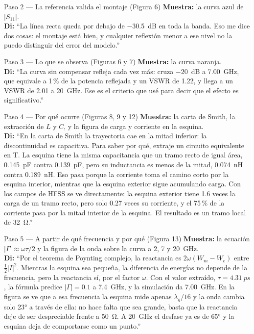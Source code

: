 \documentclass[11pt,letterpaper]{article}
\begin{document}
\begin{paso}{Paso 2 --- La referencia valida el montaje (Figura 6)}
\textbf{Muestra:} la curva azul de $|S_{11}|$.\\
\textbf{Di:} ``La línea recta queda por debajo de \SI{-30.5}{dB} en toda la banda. Eso me dice dos cosas: el montaje está bien, y cualquier reflexión menor a ese nivel no la puedo distinguir del error del modelo.''
\end{paso}

\begin{paso}{Paso 3 --- Lo que se observa (Figuras 6 y 7)}
\textbf{Muestra:} la curva naranja.\\
\textbf{Di:} ``La curva sin compensar refleja cada vez más: cruza $-20$~dB a \SI{7.00}{GHz}, que equivale a 1\,\% de la potencia reflejada y un VSWR de 1.22, y llega a un VSWR de 2.01 a \SI{20}{GHz}. Ese es el criterio que usé para decir que el efecto es significativo.''
\end{paso}

\begin{paso}{Paso 4 --- Por qué ocurre (Figuras 8, 9 y 12)}
\textbf{Muestra:} la carta de Smith, la extracción de $L$ y $C$, y la figura de carga y corriente en la esquina.\\
\textbf{Di:} ``En la carta de Smith la trayectoria cae en la mitad inferior: la discontinuidad es capacitiva. Para saber por qué, extraje un circuito equivalente en T. La esquina tiene la misma capacitancia que un tramo recto de igual área, \SI{0.145}{pF} contra \SI{0.139}{pF}, pero su inductancia es menos de la mitad, \SI{0.074}{nH} contra \SI{0.189}{nH}. Eso pasa porque la corriente toma el camino corto por la esquina interior, mientras que la esquina exterior sigue acumulando carga. Con los campos de HFSS se ve directamente: la esquina exterior tiene 1.6 veces la carga de un tramo recto, pero solo 0.27 veces su corriente, y el 75\,\% de la corriente pasa por la mitad interior de la esquina. El resultado es un tramo local de \SI{32}{\ohm}.''
\end{paso}

\begin{paso}{Paso 5 --- A partir de qué frecuencia y por qué (Figura 13)}
\textbf{Muestra:} la ecuación $|\Gamma|\approx\omega\tau/2$ y la figura de la onda sobre la curva a 2, 7 y \SI{20}{GHz}.\\
\textbf{Di:} ``Por el teorema de Poynting complejo, la reactancia es $2\omega(W_m-W_e)$ entre $\tfrac12|I|^2$. Mientras la esquina sea pequeña, la diferencia de energías no depende de la frecuencia, pero la reactancia sí, por el factor $\omega$. Con el valor extraído, $\tau=\SI{4.31}{ps}$, la fórmula predice $|\Gamma|=0.1$ a \SI{7.4}{GHz}, y la simulación da \SI{7.00}{GHz}. En la figura se ve que a esa frecuencia la esquina mide apenas $\lambda_g/16$ y la onda cambia solo \ang{23} a través de ella: no hace falta que sea grande, basta que la reactancia deje de ser despreciable frente a \SI{50}{\ohm}. A \SI{20}{GHz} el desfase ya es de \ang{65} y la esquina deja de comportarse como un punto.''
\end{paso}
\end{document}
